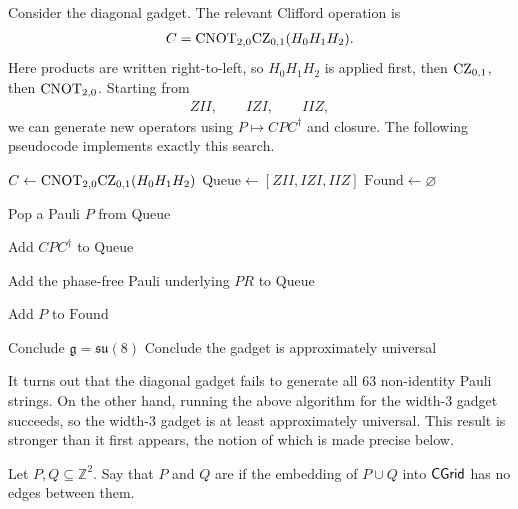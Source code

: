 \begin{example}
Consider the diagonal gadget. The relevant Clifford operation is
\begin{align}
    C
    =
    \text{CNOT}_{2,0}
    \text{CZ}_{0,1}
    (H_0 H_1 H_2).
\end{align}
Here products are written right-to-left, so \(H_0H_1H_2\) is applied first,
then \(\text{CZ}_{0,1}\), then \(\text{CNOT}_{2,0}\). Starting from 
\begin{align}
    ZII,
    \qquad
    IZI,
    \qquad
    IIZ,
\end{align}
we can generate new operators using $P \mapsto CPC^\dagger$ and closure. The following pseudocode implements exactly this search.

\begin{algorithm}[H]
\caption{$3$-qubit approximate universality check for the diagonal gadget}
\label{alg:three-qubit-gadget-universality}
\begin{algorithmic}[1]
\State $C \gets \text{CNOT}_{2,0}\text{CZ}_{0,1}(H_0H_1H_2)$
\State $\mathrm{Queue} \gets [ZII, IZI, IIZ]$
\State $\mathrm{Found} \gets \varnothing$

    \State Pop a Pauli $P$ from $\mathrm{Queue}$

        \State Add $CPC^\dagger$ to $\mathrm{Queue}$

                \State Add the phase-free Pauli underlying \(PR\) to \(\mathrm{Queue}\)
            \EndIf
        \EndFor

        \State Add $P$ to $\mathrm{Found}$
    \EndIf
\EndWhile

    \State Conclude $\mathfrak{g}=\mathfrak{su}(8)$
    \State Conclude the gadget is approximately universal
\EndIf
\end{algorithmic}
\end{algorithm}
It turns out that the diagonal gadget fails to generate all 63 non-identity Pauli strings. On the other hand, running the above algorithm for the width-3 gadget succeeds, so the width-3 gadget is at least approximately universal. This result is stronger than it first appears, the notion of which is made precise below.

\begin{definition}
\label{def:anti-diagonal-separated}
Let \(P,Q\subseteq \mathbb Z^2\). Say that \(P\) and \(Q\) are
 if the embedding of $P \cup Q$ into $\mathsf{CGrid}$ has no edges between them.
\end{definition}


\end{example}
